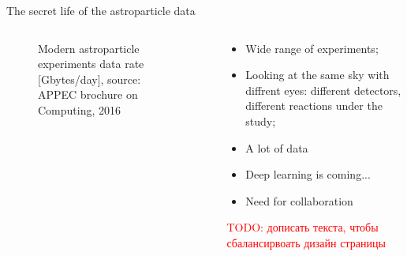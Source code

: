 \documentclass[18pt]{beamer}
\begin{document}
\begin{frame}{The secret life of the astroparticle data}
\small
\begin{columns}

\begin{column}[t]{0.5\textwidth}
\begin{figure}[h]
\vspace{-1em}
\hspace{-1em}
\vspace{-1em}
\caption{\small Modern astroparticle experiments data rate [Gbytes/day], source: APPEC brochure on Computing, 2016}
\label{ris:image}
\end{figure}
\end{column}

\begin{column}[t]{0.5\textwidth}
\begin{itemize}
 \item Wide range of experiments;
 \item Looking at the same sky with diffrent eyes: different detectors, different reactions under the study;
 \item A lot of data
 \item Deep learning is coming...
 \item Need for collaboration
\end{itemize}

\textcolor{red}{TODO: дописать текста, чтобы сбалансирвоать дизайн страницы}
\end{column}

\end{columns}
\end{frame}
\end{document}
